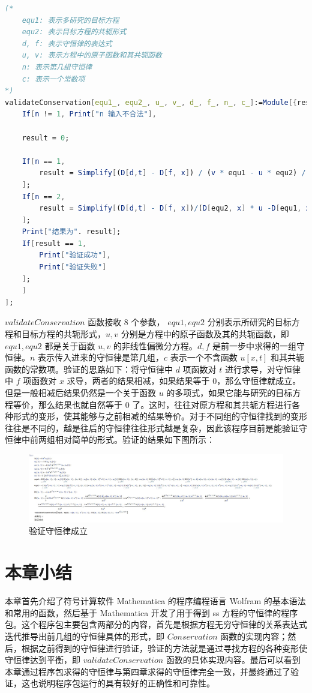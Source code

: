 \begin{lstlisting}[language=Mathematica,caption=验证守恒律]
(*
	equ1: 表示多研究的目标方程
	equ2: 表示目标方程的共轭形式
	d, f: 表示守恒律的表达式
	u, v: 表示方程中的原子函数和其共轭函数
	n: 表示第几组守恒律
	c: 表示一个常数项
*)
validateConservation[equ1_, equ2_, u_, v_, d_, f_, n_, c_]:=Module[{result, m},
	If[n != 1, Print["n 输入不合法"],
	
	result = 0;

	If[n == 1,
		result = Simplify[(D[d,t] - D[f, x]) / (v * equ1 - u * equ2) / c];
	];
	If[n == 2,
		result = Simplify[(D[d,t] - D[f, x])/(D[equ2, x] * u -D[equ1, x] * v + D[v, x] * equ1 + D[u, x] * equ2) / c];
	];
	Print["结果为". result];
	If[result == 1,
		Print["验证成功"],
		Print["验证失败"]
	];
	]
];
\end{lstlisting}
$validateConservation$ 函数接收 8 个参数， $equ1, equ2$ 分别表示所研究的目标方程和目标方程的共轭形式，$u, v$ 分别是方程中的原子函数及其的共轭函数，即 $equ1, equ2$ 都是关于函数 $u, v$ 的非线性偏微分方程。$d, f$ 是前一步中求得的一组守恒律。$n$ 表示传入进来的守恒律是第几组，$c$ 表示一个不含函数 $u[x,t]$ 和其共轭函数的常数项。验证的思路如下：将守恒律中 $d$ 项函数对 $t$ 进行求导，对守恒律中 $f$ 项函数对 $x$ 求导，两者的结果相减，如果结果等于 0，那么守恒律就成立。但是一般相减后结果仍然是一个关于函数 $u$ 的多项式，如果它能与研究的目标方程等价，那么结果也就自然等于 0 了。这时，往往对原方程和其共轭方程进行各种形式的变形，使其能够与之前相减的结果等价。对于不同组的守恒律找到的变形往往是不同的，越是往后的守恒律往往形式越是复杂，因此该程序目前是能验证守恒律中前两组相对简单的形式。验证的结果如下图所示：
\begin{figure}[!htp]
	\centering
	\includegraphics[width=\linewidth]{validateConservation.jpg}
	\caption{验证守恒律成立}
	\label{picture-5-2}
\end{figure}

\section{本章小结}
本章首先介绍了符号计算软件 Mathematica 的程序编程语言 Wolfram 的基本语法和常用的函数，然后基于 Mathematica 开发了用于得到 ss 方程的守恒律的程序包。这个程序包主要包含两部分的内容，首先是根据方程无穷守恒律的关系表达式迭代推导出前几组的守恒律具体的形式，即 $Conservation$ 函数的实现内容；然后，根据之前得到的守恒律进行验证，验证的方法就是通过寻找方程的各种变形使守恒律达到平衡，即 $validateConservation$ 函数的具体实现内容。最后可以看到本章通过程序包求得的守恒律与第四章求得的守恒律完全一致，并最终通过了验证，这也说明程序包运行的具有较好的正确性和可靠性。


